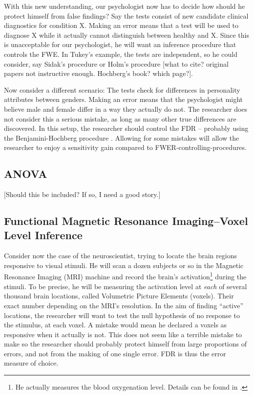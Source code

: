 \documentclass[draft,12pt]{article}
\begin{document}
With this new understanding, our psychologist now has to decide how should he protect himself from false findings? 
Say the tests consist of new candidate clinical diagnostics for condition X. Making an error means that a test will be used to diagnose X while it actually cannot distinguish between healthy and X. Since this is unacceptable for our psychologist, he will want an inference procedure that controls the FWE. In Tukey's example, the tests are independent, so he could consider, say Sidak's procedure or Holm's procedure [what to cite? original papers not instructive enough. Hochberg's book? which page?].


Now consider a different scenario: The tests check for differences in personality attributes between genders. Making an error means that the psychologist might believe male and female differ in a way they actually do not. The researcher does not consider this a serious mistake, as long as many other true differences are discovered. In this setup, the researcher should control the FDR -- probably using the Benjamini-Hochberg procedure \citep{benjamini_controlling_1995}. Allowing for some mistakes will allow the researcher to enjoy a sensitivity gain compared to FWER-controlling-procedures.


\subsection{ANOVA}
[Should this be included? If so, I need a good story.]



\subsection{\label{sub:fMRI}Functional Magnetic Resonance Imaging--Voxel Level Inference}
Consider now the case of the neuroscientist, trying to locate the brain regions responsive to visual stimuli. He will scan a dozen subjects or so in the Magnetic Resonance Imaging (MRI) machine and record the brain's activation\footnote{ He actually measures the blood oxygenation level. Details can be found in \cite{lazar_statistical_2008}.} during the stimuli. To be precise, he will be measuring the activation level at \emph{each} of several thousand brain locations, called Volumetric Picture Elements (voxels). Their exact number depending on the MRI's resolution. 
In the aim of finding ``active'' locations, the researcher will want to test the null hypothesis of no response to the stimulus, at each voxel. A mistake would mean he declared a voxels as responsive when it actually is not. This does not seem like a terrible mistake to make so the researcher should probably protect himself from large proportions of errors, and not from the making of one single error. FDR is thus the error measure of choice.
\end{document}
